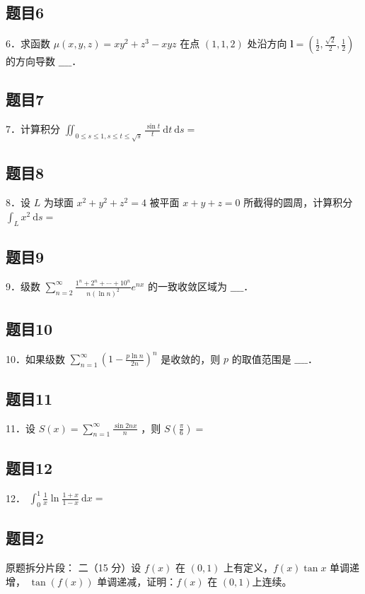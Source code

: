 \documentclass{article}
\begin{document}
\subsection{题目6}
6．求函数 \(\mu(x, y, z)=x y^{2}+z^{3}-x y z\) 在点 \((1,1,2)\) 处沿方向 \(\mathbf{l}=\left(\frac{1}{2}, \frac{\sqrt{2}}{2}, \frac{1}{2}\right)\) 的方向导数 \(\_\_\_\_\)．

\subsection{题目7}
7．计算积分 \(\iint_{0 \leq s \leq 1, s \leq t \leq \sqrt{s}} \frac{\sin t}{t} \mathrm{~d} t \mathrm{~d} s=\)

\subsection{题目8}
8．设 \(L\) 为球面 \(x^{2}+y^{2}+z^{2}=4\) 被平面 \(x+y+z=0\) 所截得的圆周，计算积分 \(\int_{L} x^{2} \mathrm{~d} s=\)

\subsection{题目9}
9．级数 \(\sum_{n=2}^{\infty} \frac{1^{n}+2^{n}+\cdots+10^{n}}{n(\ln n)^{2}} e^{n x}\) 的一致收敛区域为 \(\_\_\_\_\)．

\subsection{题目10}
10．如果级数 \(\sum_{n=1}^{\infty}\left(1-\frac{p \ln n}{2 n}\right)^{n}\) 是收敛的，则 \(p\) 的取值范围是 \(\_\_\_\_\)．

\subsection{题目11}
11．设 \(S(x)=\sum_{n=1}^{\infty} \frac{\sin 2 n x}{n}\) ，则 \(S\left(\frac{\pi}{6}\right)=\)

\subsection{题目12}
12． \(\int_{0}^{1} \frac{1}{x} \ln \frac{1+x}{1-x} \mathrm{~d} x=\)\\

\subsection{题目2}
原题拆分片段：
二（15 分）设 \(f(x)\) 在 \((0,1)\) 上有定义，\(f(x) \tan x\) 单调递增， \(\tan (f(x))\) 单调递减，证明：\(f(x)\) 在 \((0,1)\)上连续。
\end{document}
